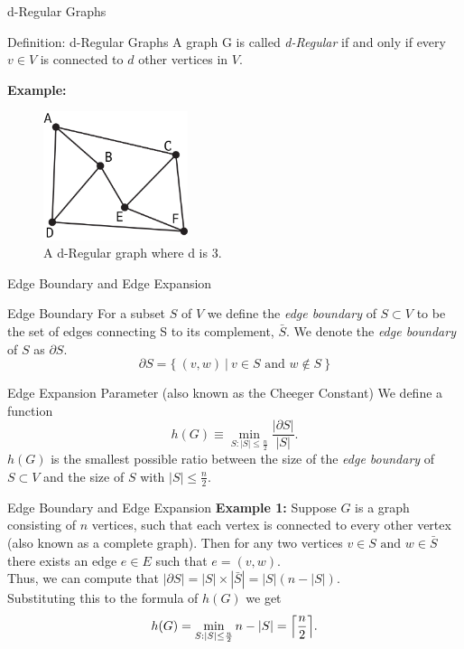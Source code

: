 \documentclass[10pt]{beamer}
\DeclarePairedDelimiter{\ceil}{\lceil}{\rceil}
\begin{document}
\begin{frame}[t]{d-Regular Graphs}
    \begin{block}{Definition: d-Regular Graphs}
        \vspace{0.5em}
        A graph G is called \textit{d-Regular} if and only if every $v \in V$ is connected to $d$ other vertices in $V$.
        \vspace{0.5em}
    \end{block}
    \vspace{2pt}
    \pause{}
    \textbf{Example:}
    \begin{figure}
        \centering
        \includegraphics[width=120pt]{dGraph}
        \caption{A d-Regular graph where d is 3.}
    \end{figure}
\end{frame}

\begin{frame}[t]{Edge Boundary and Edge Expansion}
    \begin{block}{Edge Boundary}
        For a subset $S$ of $V$ we define the \textit{edge boundary} of $S \subset V$ to be the set of edges connecting S to its complement, $\bar{S}$. We denote the \textit{edge boundary} of $S$ as $\partial S$.
        \[\partial S = \{\ (v, w)\ |\ v \in S \text{ and } w \not \in S\ \}\]
    \end{block}
    \pause{}
    \begin{block}{Edge Expansion Parameter (also known as the Cheeger Constant)}
        We define a function \[h(G) \equiv \min\limits_{S:|S|\leq \frac{n}{2}} \frac{|\partial S|}{|S|}\text{.}\]
        $h(G)$ is the smallest possible ratio between the size of the \textit{edge boundary} of $S \subset V$ and the size of $S$ with $|S| \leq \frac{n}{2}$.
    \end{block}
\end{frame}

\begin{frame}[t]{Edge Boundary and Edge Expansion}
    \textbf{Example 1:} Suppose $G$ is a graph consisting of $n$ vertices, such that each vertex is connected to every other vertex (also known as a complete graph). Then for any two vertices $v \in S \text{ and } w \in \bar{S}$ there exists an edge $e \in E$ such that $e=(v,w)$.\\
    \vspace{5pt}
    \pause{}
    Thus, we can compute that $|\partial S|=|S| \times |\bar{S}|=|S|(n-|S|)$.\pause\\
    \vspace{5pt}
    Substituting this to the formula of $h(G)$ we get\\
    \[h(G)=\min\limits_{S:|S|\leq \frac{n}{2}} n - |S| = \ceil[\Big]{\frac{n}{2}}\text{.}\]
\end{frame}
\end{document}
